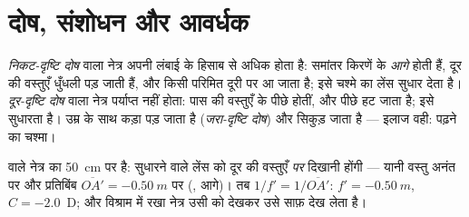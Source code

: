 \section{दोष, संशोधन और आवर्धक}

\begin{definition}[निकट-दृष्टि और दूर-दृष्टि दोष]\label{def:g11:lenses-and-eye:defects}
\emph{निकट-दृष्टि दोष} वाला नेत्र अपनी लंबाई के
हिसाब से अधिक  होता है: समांतर किरणें
 के \emph{आगे}  होती हैं, दूर की वस्तुएँ धुँधली
पड़ जाती हैं, और  किसी परिमित दूरी पर आ जाता है; इसे
 चश्मे का लेंस सुधार देता है। \emph{दूर-दृष्टि
दोष} वाला नेत्र पर्याप्त  नहीं
होता: पास की वस्तुएँ  के पीछे  होतीं, और
 पीछे हट जाता है; इसे  सुधारता
है। उम्र के साथ  कड़ा पड़ जाता है (\emph{जरा-दृष्टि
दोष}) और  सिकुड़ जाता है --- इलाज
वही: पढ़ने का चश्मा।
\end{definition}

\begin{example}[निकट-दृष्टि दोष का नुस्ख़ा]\label{ex:g11:lenses-and-eye:correction}
 वाले नेत्र का  \qty{50}{cm} पर है:
सुधारने वाले लेंस को दूर की वस्तुएँ \emph{ पर}
दिखानी होंगी --- यानी वस्तु अनंत पर और प्रतिबिंब $\overline{OA'} = \qty{-0.50}{m}$ पर
(, आगे)। तब $1/f' = 1/\overline{OA'}$: $f' = \qty{-0.50}{m}$, $C = -2.0$~D; और विश्राम में
रखा नेत्र उसी  को देखकर उसे साफ़ देख लेता है।
\end{example}

